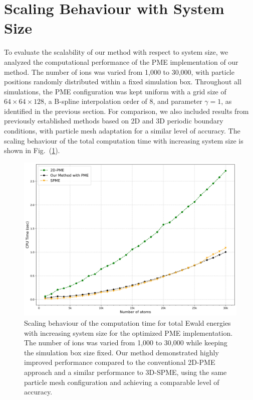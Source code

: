 \section{Scaling Behaviour with System Size}
To evaluate the scalability of our method with respect to system size, we analyzed the computational performance of the PME implementation of our method. The number of ions was varied from 1,000 to 30,000, with particle positions randomly distributed within a fixed simulation box. Throughout all simulations, the PME configuration was kept uniform with a grid size of $64 \times 64 \times 128$, a B-spline interpolation order of 8, and parameter $\gamma = 1$, as identified in the previous section. For comparison, we also included results from previously established methods based on 2D and 3D periodic boundary conditions, with particle mesh adaptation for a similar level of accuracy. The scaling behaviour of the total computation time with increasing system size is shown in Fig.~(\ref{fig:scaling_results}). 
\begin{figure}[]
    \centering
    \includegraphics[width=\linewidth]{images/Scaling_behaviour_Result30k.jpg}
    \caption{Scaling behaviour of the computation time for total Ewald energies with increasing system size for the optimized PME implementation. The number of ions was varied from 1,000 to 30,000 while keeping the simulation box size fixed.  Our method demonstrated highly improved performance compared to the conventional 2D-PME approach and a similar performance to 3D-\ac{SPME}, using the same particle mesh configuration and achieving a comparable level of accuracy.}
    \label{fig:scaling_results}
\end{figure}
